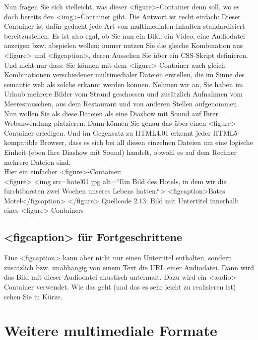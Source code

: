 Nun fragen Sie sich vielleicht, was dieser <figure>-Container denn soll, wo es doch bereits den <img>-Container gibt. Die Antwort ist recht einfach: Dieser Container ist dafür gedacht jede Art von multimedialen Inhalten standardisiert bereitzustellen. Es ist also egal, ob Sie nun ein Bild, ein Video, eine Audiodatei anzeigen bzw. abspielen wollen; immer nutzen Sie die gleiche Kombination aus <figure> und <figcaption>, deren Aussehen Sie über ein CSS-Skript definieren.\\

Und nicht nur dass: Sie können mit dem <figure>-Container auch gleich Kombinationen verschiedener multimedialer Dateien erstellen, die im Sinne des semantic web als solche erkannt werden können. Nehmen wir an, Sie haben im Urlaub mehrere Bilder vom Strand geschossen und zusätzlich Aufnahmen vom Meeresrauschen, aus dem Restaurant und von anderen Stellen aufgenommen. Nun wollen Sie als diese Dateien als eine Diashow mit Sound auf Ihrer Webanwendung platzieren. Dann können Sie genau das über einen <figure>-Container erledigen. Und im Gegensatz zu HTML4.01 erkennt jeder HTML5-kompatible Browser, dass es sich bei all diesen einzelnen Dateien um eine logische Einheit (eben Ihre Diashow mit Sound) handelt, obwohl es auf dem Rechner mehrere Dateien sind.\\

Hier ein einfacher <figure>-Container:\\

<figure>
<img src=hotel01.jpg alt=“Ein Bild des Hotels, in dem wir die furchtbarsten zwei Wochen unseres Lebens hatten.“>
<figcaption>Bates Motel</figcaption>
</figure>
Quellcode 2.13: Bild mit Untertitel innerhalb eines <figure>-Containers

\subsection{<figcaption> für Fortgeschrittene}

Eine <figcaption> kann aber nicht nur einen Untertitel enthalten, sondern zusätzlich bzw. unabhängig von einem Text die URL einer Audiodatei. Dann wird das Bild mit dieser Audiodatei akustisch untermalt. Dazu wird ein <audio>-Container verwendet. Wie das geht (und das es sehr leicht zu realisieren ist) sehen Sie in Kürze.

\section{Weitere multimediale Formate}

